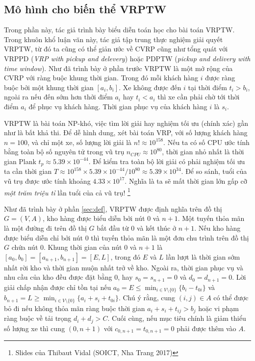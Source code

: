 \subsection{Mô hình cho biến thể VRPTW}
\label{sec:math_vrptw}

Trong phần này, tác giả trình bày biểu diễn toán học cho bài toán VRPTW. Trong khuôn khổ luận văn này, tác giả tập trung thực nghiệm giải quyết VRPTW, từ đó ta cũng có thể giản ước về CVRP cũng như tổng quát với VRPPD (\textit{VRP with pickup and delevery}) hoặc PDPTW (\textit{pickup and delivery with time window}). Như đã trình bày ở phần trước VRPTW là một mở rộng của CVRP với ràng buộc khung thời gian. Trong đó mỗi khách hàng $i$ được ràng buộc bởi một khung thời gian $[a_i,b_i]$. Xe không được đến $i$ tại thời điểm $t_i > b_i$, ngoài ra nếu đến sớm hơn thởi điểm $a_i$ hay $t_i < a_i$ thì xe cần phải chờ tới thời điểm $a_i$ để phục vụ khách hàng. Thời gian phục vụ của khách hàng $i$ là $s_i$.

VRPTW là bài toán NP-khó, việc tìm lời giải hay nghiệm tối ưu (chính xác) gần như là bất khả thi. Để dễ hình dung, xét bài toán VRP, với số lượng khách hàng $n=100$, và chỉ một xe, số lượng lời giải là $n! \approx 10^{158}$. Nếu ta có số CPU ước tính bằng toàn bộ số nguyên tử trong vũ trụ $n_{CPU} \approx 10^{80}$, thời gian nhỏ nhất là thời gian Plank $t_p \approx 5.39 \times 10^{-44}$. Để kiểm tra toàn bộ lời giải có phải nghiệm tối ưu ta cần thời gian $T \approx 10^{158} \times 5.39 \times 10^{-44} / 10^{80} \approx 5.39 \times 10^{34}$. Để so sánh, tuổi của vũ trụ được ước tính khoảng $4.33 \times 10^{17}$. Nghĩa là ta sẽ mất thời gian lớn gấp cỡ \textit{một trăm triệu tỉ} lần tuổi của cả vũ trụ! \footnote[1]{Slides của Thibaut Vidal (SOICT, Nha Trang 2017)}

Như đã trình bày ở phần \ref{sec:def}, VRPTW được định nghĩa trên đồ thị $G = (V, A)$, kho hàng được biểu diễn bởi nút $0$ và $n+1$. Một tuyến thỏa mãn là một đường đi trên đồ thị $G$ bắt đầu từ $0$ và kết thúc ở $n+1$. Nếu kho hàng được biểu diễn chỉ bởi nút $0$ thì tuyến thỏa mãn là một đơn chu trình trên đồ thị $G$ chứa nút $0$. Khung thời gian của nút $0$ và $n+1$ là $[a_0, b_0] = [a_{n+1}, b_{n+1}] = [E, L]$, trong đó $E$ và $L$ lần lượt là thời gian sớm nhất rời kho và thời gian muộn nhất trở về kho. Ngoài ra, thời gian phục vụ và nhu cầu của kho đều được đặt bằng 0, hay $s_0 = s_{n+1} = 0$ và $d_0 = d_{n+1} = 0$. Lời giải chấp nhận được chỉ tồn tại nếu $a_0 = E \leq \min_{i \in V \setminus \{0\}} \{b_i - t_{0i}\}$ và $b_{n+1} = L \geq \min_{i \in V \setminus \{0\}} \{ a_i + s_i + t_{0i} \}$. Chú ý rằng, cung $(i,j) \in A$ có thể được bỏ đi nếu không thỏa mãn ràng buộc thời gian $a_i + s_i + t_{ij} > b_j$ hoặc vi phạm ràng buộc về tải trọng $d_i + d_j > C$. Cuối cùng, nếu mục tiêu chính là giảm thiểu số lượng xe thì cung $(0,n+1)$ với $c_{0,n+1} = t_{0,n+1} = 0$ phải được thêm vào $A$.

